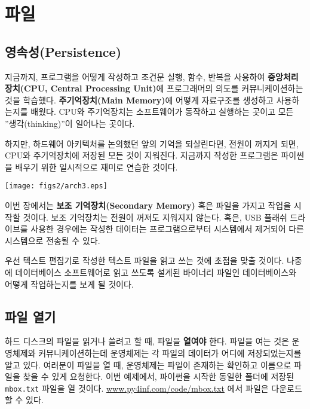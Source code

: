 
\chapter{파일}



\section{영속성(Persistence)}


지금까지, 프로그램을 어떻게 작성하고 조건문 실행, 함수, 반복을 사용하여 
{\bf 중앙처리장치(CPU, Central Processing Unit)}에 프로그래머의 의도를 커뮤니케이션하는 것을 학습했다.
{\bf 주기억장치(Main Memory)}에 어떻게 자료구조를 생성하고 사용하는지를 배웠다.
CPU와 주기억장치는 소프트웨어가 동작하고 실행하는 곳이고  모든 ''생각(thinking)''이 일어나는 곳이다.

하지만, 하드웨어 아키텍처를 논의했던 앞의 기억을 되살린다면,
전원이 꺼지게 되면, CPU와 주기억장치에 저장된 모든 것이 지워진다.
지금까지 작성한 프로그램은 파이썬을 배우기 위한 일시적으로 재미로 연습한 것이다.

\beforefig
\centerline{\texttt{[image: figs2/arch3.eps]}}
\afterfig

이번 장에서는 {\bf 보조 기억장치(Secondary Memory)} 혹은 파일을 가지고 작업을 시작할 것이다.
보조 기억장치는 전원이 꺼져도 지워지지 않는다.
혹은, USB 플래쉬 드라이브를 사용한 경우에는 작성한 데이터는 프로그램으로부터 시스템에서 제거되어 다른 시스템으로 전송될 수 있다.

우선 텍스트 편집기로 작성한 텍스트 파일을 읽고 쓰는 것에 초점을 맞출 것이다.
나중에 데이터베이스 소프트웨어로 읽고 쓰도록 설계된 바이너리 파일인 데이터베이스와 어떻게 작업하는지를 보게 될 것이다.


\section{파일 열기}

하드 디스크의 파일을 읽거나 쓸려고 할 때, 파일을 {\bf 열여야} 한다.
파일을 여는 것은 운영체제와 커뮤니케이션하는데 운영체제는 각 파일의 데이터가 어디에 저장되었는지를 알고 있다.
여러분이 파일을 열 때, 운영체제는 파일이 존재하는 확인하고 이름으로 파일을 찾을 수 있게 요청한다.    
이번 예제에서, 파이썬을 시작한 동일한 폴더에 저장된 {\tt mbox.txt} 파일을 열 것이다.  
\url{www.py4inf.com/code/mbox.txt} 에서 파일은 다운로드할 수 있다.

